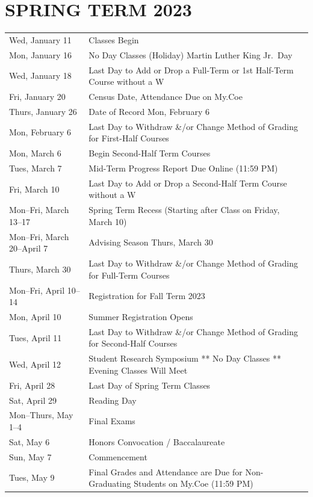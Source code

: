 \documentclass[
  letterpaper,
]{scrbook}
\renewcommand\toprule[2]\relax
\renewcommand\bottomrule[2]\relax
\begin{document}
\section{SPRING TERM 2023}\label{spring-term-2023}

\begin{longtable}[]{@{}
  >{\raggedright\arraybackslash}p{}
  >{\raggedleft\arraybackslash}p{}@{}}
\toprule\noalign{}
\endhead
\bottomrule\noalign{}
\endlastfoot
Wed, January 11 & Classes Begin \\
Mon, January 16 & No Day Classes (Holiday) Martin Luther King Jr.~Day \\
Wed, January 18 & Last Day to Add or Drop a Full-Term or 1st Half-Term
Course without a W \\
Fri, January 20 & Census Date, Attendance Due on My.Coe \\
Thurs, January 26 & Date of Record Mon, February 6 \\
Mon, February 6 & Last Day to Withdraw \&/or Change Method of Grading
for First-Half Courses \\
Mon, March 6 & Begin Second-Half Term Courses \\
Tues, March 7 & Mid-Term Progress Report Due Online (11:59 PM) \\
Fri, March 10 & Last Day to Add or Drop a Second-Half Term Course
without a W \\
Mon--Fri, March 13--17 & Spring Term Recess (Starting after Class on
Friday, March 10) \\
Mon--Fri, March 20--April 7 & Advising Season Thurs, March 30 \\
Thurs, March 30 & Last Day to Withdraw \&/or Change Method of Grading
for Full-Term Courses \\
Mon--Fri, April 10--14 & Registration for Fall Term 2023 \\
Mon, April 10 & Summer Registration Opens \\
Tues, April 11 & Last Day to Withdraw \&/or Change Method of Grading for
Second-Half Courses \\
Wed, April 12 & Student Research Symposium ** No Day Classes ** Evening
Classes Will Meet \\
Fri, April 28 & Last Day of Spring Term Classes \\
Sat, April 29 & Reading Day \\
Mon--Thurs, May 1--4 & Final Exams \\
Sat, May 6 & Honors Convocation / Baccalaureate \\
Sun, May 7 & Commencement \\
Tues, May 9 & Final Grades and Attendance are Due for Non-Graduating
Students on My.Coe (11:59 PM) \\
\end{longtable}
\end{document}
